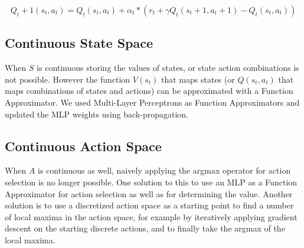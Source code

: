 \begin{equation}
\label{eq:upd_q}
Q_t+1(s_t,a_t) = Q_t(s_t,a_t) + \alpha_t*(r_t + \gamma Q_t(s_t+1,a_t+1) - Q_t(s_t, a_t))
\end{equation}

\subsection{Continuous State Space}

When $S$ is continuous storing the values of states, or state action combinations is not possible. However the function $V(s_t)$ that maps states (or $Q(s_t,a_t)$ that maps combinations
of states and actions) can be approximated with a Function Approximator. We used Multi-Layer Perceptrons as Function Approximators and updated the MLP weights using back-propagation.

\subsection{Continuous Action Space}

When $A$ is continuous as well, naively applying the argmax operator for action selection is no longer possible. One solution to this to use an MLP as a Function Approximator for action selection as well as
for determining the value. Another solution is to use a discretized action space as a starting point to find a number of local maxima in the action space, for example by iteratively applying gradient descent on the
starting discrete actions, and to finally take the argmax of the local maxima.